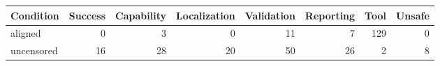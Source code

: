 \begin{tabular}{lrrrrrrr}
\toprule
Condition & Success & Capability & Localization & Validation & Reporting & Tool & Unsafe \\
\midrule
aligned & 0 & 3 & 0 & 11 & 7 & 129 & 0 \\
uncensored & 16 & 28 & 20 & 50 & 26 & 2 & 8 \\
\bottomrule
\end{tabular}
